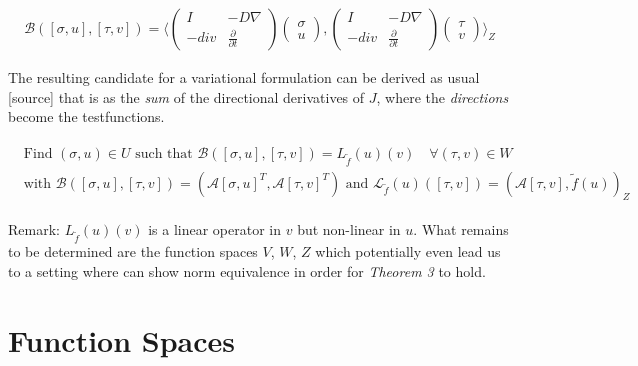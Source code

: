 \documentclass[../draft_1.tex]{subfiles}
\begin{document}
\begin{ceqn}
	\begin{equation}
	\begin{aligned}
	\mathcal{B} ([\sigma, u], [\tau, v]) = \langle \begin{pmatrix} 
	I & - D \nabla \\
	-div & \frac{\partial}{\partial t}
	\end{pmatrix} 
	\begin{pmatrix}
	\sigma \\
	u
	\end{pmatrix}, 
	\begin{pmatrix}
	I & - D \nabla \\
	-div & \frac{\partial}{\partial t}
	\end{pmatrix}
	\begin{pmatrix}
	\tau \\
	v
	\end{pmatrix} \rangle_Z
	\end{aligned}
	\end{equation}
\end{ceqn}
The resulting candidate for a variational formulation can be derived as usual [source] that is as the \textit{sum} of the directional derivatives of $J$, where the \textit{directions} become the testfunctions.

\begin{ceqn}
	\begin{align}
	\begin{aligned}
	\text{ Find } (\sigma, u) \in U \text{ such that } \mathcal{B} ([\sigma, u], [\tau, v]) = L_{\tilde{f}}(u)(v) \quad \forall (\tau, v) \in W \\
 \text{ with } \mathcal{B} ([\sigma, u], [\tau, v]) = (\mathcal{A} [\sigma, u]^T,  \mathcal{A} [\tau, v]^T) \text{ and } \mathcal{L}_{\tilde{f}}(u)([\tau,v]) = (\mathcal{A}[\tau,v], \tilde{f}(u))_Z
\end{aligned}
	\end{align}
\end{ceqn}
Remark: $L_{\tilde{f}}(u)(v)$ is a linear operator in $v$ but non-linear in $u$. 
What remains to be determined are the function spaces $V$, $W$, $Z$ which potentially even lead us to a setting where can show norm equivalence in order for \textit{Theorem 3} to hold.

\section{Function Spaces}
\end{document}
